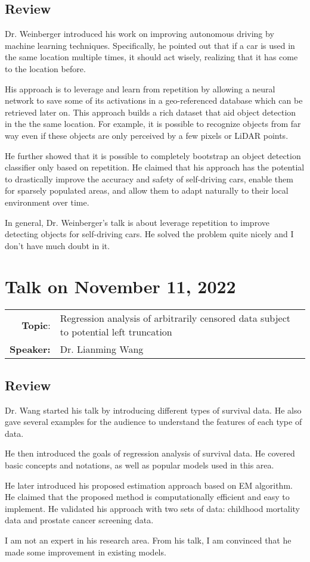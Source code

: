 \documentclass[11pt, oneside]{article}   	%
\begin{document}
\subsection{Review}

Dr. Weinberger introduced his work on improving autonomous driving by machine learning techniques. Specifically, he pointed out that if a car is used in the same location multiple times, it should act wisely, realizing that it has come to the location before. 

His approach is to leverage and learn from repetition by allowing a neural network to save some of its activations in a geo-referenced database which can be retrieved later on. This approach builds a rich dataset that aid object detection in the the same location. For example, it is possible to recognize objects from far way even if these objects are only perceived by a few pixels or LiDAR points. 

He further showed that it is possible to completely bootstrap an object detection classifier only based on repetition. He claimed that his approach has the potential to drastically improve the accuracy and safety of self-driving cars, enable them for sparsely populated areas, and allow them to adapt naturally to their local environment over time.

In general, Dr. Weinberger's talk is about leverage repetition to improve detecting objects for self-driving cars. He solved the problem quite nicely and I don't have much doubt in it. 


\newpage
\section{Talk on November 11, 2022}
\begin{tabularx} {\textwidth}{r X}
\textbf{Topic}: & Regression analysis of arbitrarily censored data subject to potential left truncation\\
\textbf{Speaker:} & Dr. Lianming Wang\\
\end{tabularx}

\subsection{Review}
Dr. Wang started his talk by introducing different types of survival data. He also gave several examples for the audience to understand the features of each type of data. 

He then introduced the goals of regression analysis of survival data. He covered basic concepts and notations, as well as popular models used in this area.

He later introduced his proposed estimation approach based on EM algorithm. He claimed that the proposed method is computationally efficient and easy to implement. He validated his approach with two sets of data: childhood mortality data and prostate cancer screening data.

I am not an expert in his research area. From his talk, I am convinced that he made some improvement in existing models.
\end{document}
